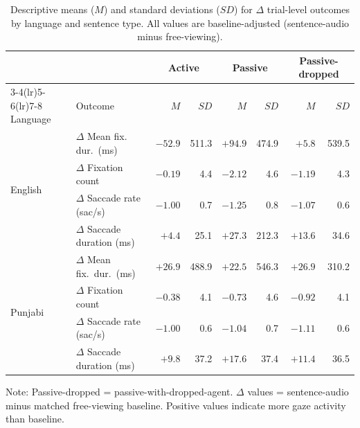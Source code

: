 \documentclass[12pt, a4paper]{article}
\begin{document}
\begin{table}[h]
\centering
\caption{Descriptive means ($M$) and standard deviations ($SD$) for
         $\Delta$ trial-level outcomes by language and sentence type.
         All values are baseline-adjusted (sentence-audio minus free-viewing).}
\label{tab:trial_means}
\begin{threeparttable}
\begin{tabular}{llrrrrrr}
\toprule
& & \multicolumn{2}{c}{Active} & \multicolumn{2}{c}{Passive} & \multicolumn{2}{c}{Passive-dropped} \\
\cmidrule(lr){3-4}\cmidrule(lr){5-6}\cmidrule(lr){7-8}
Language & Outcome & $M$ & $SD$ & $M$ & $SD$ & $M$ & $SD$ \\
\midrule
\multirow{4}{*}{English}
  & $\Delta$ Mean fix. dur.\ (ms)     & $-52.9$ & 511.3 & $+94.9$ & 474.9 & $+5.8$  & 539.5 \\
  & $\Delta$ Fixation count           & $-0.19$ &   4.4 & $-2.12$ &   4.6 & $-1.19$ &   4.3 \\
  & $\Delta$ Saccade rate (sac/s)     & $-1.00$ &   0.7 & $-1.25$ &   0.8 & $-1.07$ &   0.6 \\
  & $\Delta$ Saccade duration (ms)    & $+4.4$  &  25.1 & $+27.3$ & 212.3 & $+13.6$ &  34.6 \\[4pt]
\multirow{4}{*}{Punjabi}
  & $\Delta$ Mean fix.\ dur.\ (ms)    & $+26.9$ & 488.9 & $+22.5$ & 546.3 & $+26.9$ & 310.2 \\
  & $\Delta$ Fixation count           & $-0.38$ &   4.1 & $-0.73$ &   4.6 & $-0.92$ &   4.1 \\
  & $\Delta$ Saccade rate (sac/s)     & $-1.00$ &   0.6 & $-1.04$ &   0.7 & $-1.11$ &   0.6 \\
  & $\Delta$ Saccade duration (ms)    & $+9.8$  &  37.2 & $+17.6$ &  37.4 & $+11.4$ &  36.5 \\
\bottomrule
\end{tabular}
\begin{tablenotes}
\footnotesize
\item Note: Passive-dropped = passive-with-dropped-agent.
      $\Delta$ values = sentence-audio minus matched free-viewing baseline.
      Positive values indicate more gaze activity than baseline.
\end{tablenotes}
\end{threeparttable}
\end{table}
\end{document}
